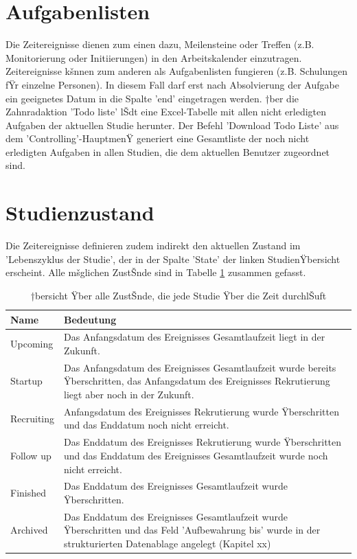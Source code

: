 \documentclass[11pt,oneside]{scrbook}
\begin{document}
\section{Aufgabenlisten}
Die Zeitereignisse dienen zum einen dazu, Meilensteine oder Treffen (z.B. Monitorierung oder Initiierungen) in den Arbeitskalender einzutragen. Zeitereignisse kšnnen zum anderen als Aufgabenlisten fungieren (z.B. Schulungen fŸr einzelne Personen). In diesem Fall darf  erst nach Absolvierung der Aufgabe ein geeignetes Datum in die Spalte 'end' eingetragen werden. †ber die Zahnradaktion 'Todo liste' lŠdt eine Excel-Tabelle mit allen nicht erledigten Aufgaben der aktuellen Studie herunter. Der Befehl 'Download Todo Liste'  aus dem 'Controlling'-HauptmenŸ generiert eine Gesamtliste der noch nicht erledigten Aufgaben in allen Studien, die dem aktuellen Benutzer zugeordnet sind.

\section{Studienzustand}
\label{section:zyklus}
Die Zeitereignisse definieren zudem indirekt den aktuellen Zustand im 'Lebenszyklus der Studie', der in der Spalte 'State' der linken StudienŸbersicht erscheint. Alle mšglichen ZustŠnde sind in Tabelle \ref{tab:trialstates} zusammen gefasst.

\begin{table}[htdp]
\caption{†bersicht Ÿber alle ZustŠnde, die jede Studie Ÿber die Zeit durchlŠuft}
\begin{center}
\begin{tabular}{p{4cm}p{8cm}}
Name & Bedeutung \\\hline
Upcoming  & Das Anfangsdatum des Ereignisses Gesamtlaufzeit liegt in der Zukunft.\\
Startup & Das Anfangsdatum des Ereignisses Gesamtlaufzeit wurde bereits Ÿberschritten, das Anfangsdatum des Ereignisses Rekrutierung liegt aber noch in der Zukunft.\\
Recruiting & Anfangsdatum des Ereignisses Rekrutierung wurde Ÿberschritten und das Enddatum noch nicht erreicht.\\
Follow up & Das Enddatum des Ereignisses Rekrutierung wurde Ÿberschritten und das Enddatum des Ereignisses Gesamtlaufzeit wurde noch nicht erreicht.\\
Finished & Das Enddatum des Ereignisses Gesamtlaufzeit wurde Ÿberschritten.\\
Archived & Das Enddatum des Ereignisses Gesamtlaufzeit wurde Ÿberschritten und das Feld 'Aufbewahrung bis' wurde in der strukturierten Datenablage angelegt (Kapitel xx)\\
\end{tabular}
\end{center}
\label{tab:trialstates}
\end{table}
\end{document}

